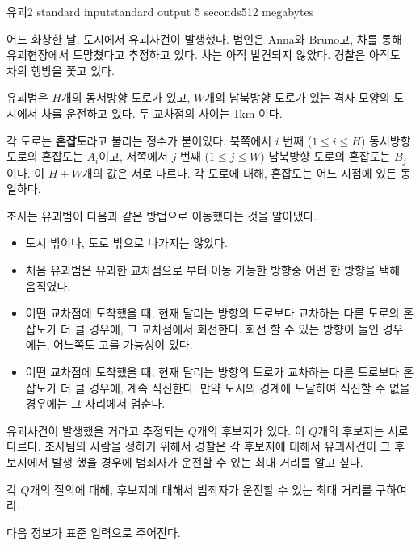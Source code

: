 \begin{problem}{유괴2}
	{standard input}{standard output}
	{5 seconds}{512 megabytes}{}
	
	어느 화창한 날, 도시에서 유괴사건이 발생했다. 범인은 Anna와 Bruno고, 차를 통해 유괴현장에서 도망쳤다고 추정하고 있다. 차는 아직 발견되지 않았다. 경찰은 아직도 차의 행방을 쫓고 있다.
	
	유괴범은 $H$개의 동서방향 도로가 있고, $W$개의 남북방향 도로가 있는 격자 모양의 도시에서 차를 운전하고 있다. 두 교차점의 사이는 1km 이다.
	
	각 도로는 \textbf{혼잡도}라고 불리는 정수가 붙어있다. 북쪽에서 $i$ 번째 ($1 \le i \le H$) 동서방향 도로의 혼잡도는 $A_i$이고, 서쪽에서 $j$ 번째 ($1 \le j \le W$) 남북방향 도로의 혼잡도는 $B_j$ 이다. 이 $H+W$개의 값은 서로 다르다. 각 도로에 대해, 혼잡도는 어느 지점에 있든 동일하다.
	
	조사는 유괴범이 다음과 같은 방법으로 이동했다는 것을 알아냈다.
	
	\begin{itemize}
		\item 도시 밖이나, 도로 밖으로 나가지는 않았다.
		\item 처음 유괴범은 유괴한 교차점으로 부터 이동 가능한 방향중 어떤 한 방향을 택해 움직였다.
		\item 어떤 교차점에 도착했을 때, 현재 달리는 방향의 도로보다 교차하는 다른 도로의 혼잡도가 더 클 경우에, 그 교차점에서 회전한다. 회전 할 수 있는 방향이 둘인 경우에는, 어느쪽도 고를 가능성이 있다.
		\item 어떤 교차점에 도착했을 때, 현재 달리는 방향의 도로가 교차하는 다른 도로보다 혼잡도가 더 클 경우에, 계속 직진한다. 만약 도시의 경계에 도달하여 직진할 수 없을 경우에는 그 자리에서 멈춘다.
	\end{itemize}

	유괴사건이 발생했을 거라고 추정되는 $Q$개의 후보지가 있다. 이 $Q$개의 후보지는 서로 다르다. 조사팀의 사람을 정하기 위해서 경찰은 각 후보지에 대해서 유괴사건이 그 후보지에서 발생 했을 경우에 범죄자가 운전할 수 있는 최대 거리를 알고 싶다.
	
	각 $Q$개의 질의에 대해, 후보지에 대해서 범죄자가 운전할 수 있는 최대 거리를 구하여라. 
		
	\InputFile
	
	다음 정보가 표준 입력으로 주어진다.
	

\end{problem}
